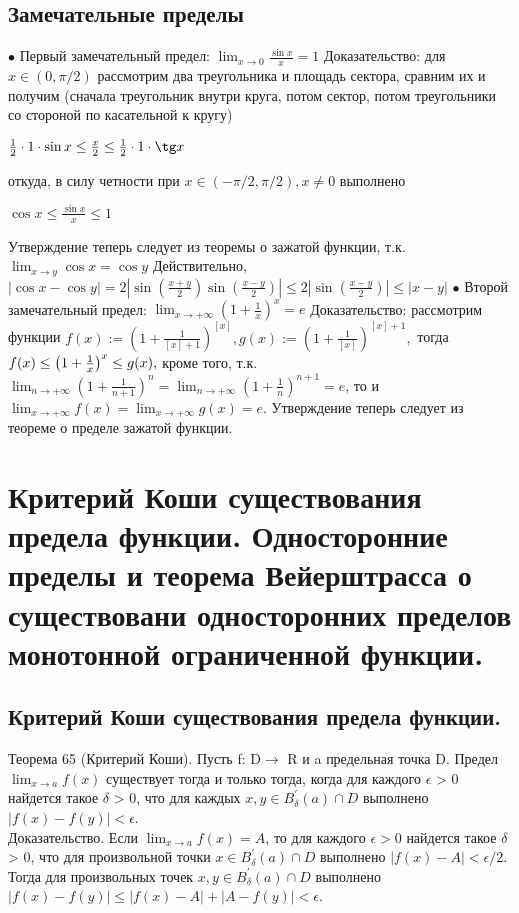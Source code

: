 \documentclass[12pt]{article}
\theoremstyle{definition}
\begin{document}
\subsection{Замечательные пределы}
$\bullet$ Первый замечательный предел: $\lim_{x \to 0}\frac{\sin x}{x} = 1$ \newline
Доказательство: для $x \in (0, \pi/2)$ рассмотрим два треугольника и площадь сектора, сравним их и получим (сначала треугольник внутри круга, потом сектор, потом треугольники со стороной по касательной к кругу)
\begin{center}
$\frac12 \cdot 1 \cdot \sin x \leq \frac{x}2\leq \frac12 \cdot 1 \cdot \tg x$
\end{center}
откуда, в силу четности при $x \in (-\pi/2, \pi/2), x \not = 0$ выполнено
\begin{center}
$\cos x \leq \frac{\sin x}{x} \leq 1$
\end{center}
Утверждение теперь следует из теоремы о зажатой функции, т.к. $\lim_{x \to y} \cos x = \cos y$\newline
Действительно, $|\cos x - \cos y| = 2|\sin{(\frac{x+y}{2})}\sin{(\frac{x-y}{2})}| \leq 2|\sin{(\frac{x-y}{2})}|\leq |x - y|$\newline\newline
$\bullet$ Второй замечательный предел: $\lim _{x \to +\infty}\left(1 + \frac1x\right)^x = e$\newline
Доказательство: рассмотрим функции $f(x) := (1 + \frac{1}{[x] + 1})^{[x]}, g(x) := (1 + \frac{1}{[x]})^{[x] + 1}, $ тогда $ \newline
f(x) \leq \left(1 + \frac1x\right)^x \leq g(x), $ кроме того, т.к.  $\lim_{n \to +\infty} (1 + \frac{1}{n + 1})^{n} = \lim_{n \to +\infty} (1 + \frac{1}{n})^{n + 1} = e$, то и $\lim_{x \to +\infty} f(x) = \lim_{x \to +\infty} g(x) =e$. Утверждение теперь следует из теореме о пределе зажатой функции.

\section{Критерий Коши существования предела функции. Односторонние пределы и теорема Вейерштрасса о существовани односторонних пределов монотонной ограниченной функции.
}

\smallskip
\subsection{Критерий Коши существования предела функции.}
Теорема 65 (Критерий Коши). Пусть f: D$\to$ R и a предельная точка D. Предел $\lim_{x \to a} f(x)$ существует тогда и только тогда, когда для каждого $\epsilon$ > 0 найдется такое $\delta$ > 0, что для каждых $x, y \in B^{'}_{\delta} (a) \cap D$  выполнено $|f(x) - f(y)| < \epsilon$. \\
Доказательство. Если $\lim_{x \to a} f(x) = A$, то для каждого $\epsilon > 0$ найдется такое $\delta$ > 0, что для произвольной точки $x \in B^{'}_{\delta} (a) \cap D$  выполнено $|f(x) - A| < \epsilon / 2$. Тогда для произвольных точек $x, y \in B^{'}_{\delta} (a) \cap D$ выполнено $|f(x) - f(y)| \leq |f(x) - A| + |A - f(y)| < \epsilon$. \\
\end{document}
